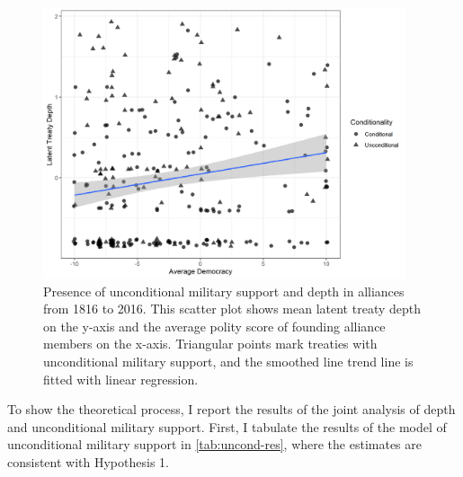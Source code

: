 \documentclass[12pt]{article}
\begin{document}
\begin{figure}[hbtp]
\centering
\includegraphics[width=0.95\textwidth]{../figures/democ-combo.png}
\caption{Presence of unconditional military support and depth in alliances from 1816 to 2016. This scatter plot shows mean latent treaty depth on the y-axis and the average polity score of founding alliance members on the x-axis. Triangular points mark treaties with unconditional military support, and the smoothed line trend line is fitted with linear regression. }
\label{fig:democ-combo}
\end{figure}


To show the theoretical process, I report the results of the joint analysis of depth and unconditional military support. 
First, I tabulate the results of the model of unconditional military support in \autoref{tab:uncond-res}, where the estimates are consistent with Hypothesis 1. 
\end{document}
